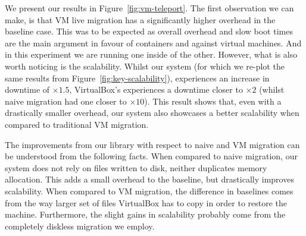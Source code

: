 We present our results in Figure~\ref{fig:vm-teleport}.
The first observation we can make, is that VM live migration has a
significantly higher overhead in the baseline case.
This was to be expected as overall overhead and slow boot times are the main
argument in favour of containers and against virtual machines.
And in this experiment we are running one inside of the other.
However, what is also worth noticing is the scalability.
Whilst our system (for which we re-plot the same results from
Figure~\ref{fig:key-scalability}), experiences an increase in downtime of
$\times 1.5$, VirtualBox's experiences a downtime closer to $\times 2$ (whilst
naive migration had one closer to $\times 10$).
This result shows that, even with a drastically smaller overhead, our system
also showcases a better scalability when compared to traditional VM migration.

The improvements from our library with respect to naive and VM migration can be
understood from the following facts.
When compared to naive migration, our system does not rely on files written to
disk, neither duplicates memory allocation.
This adds a small overhead to the baseline, but drastically improves
scalability.
When compared to VM migration, the difference in baselines comes from the way
larger set of files VirtualBox has to copy in order to restore the machine.
Furthermore, the slight gains in scalability probably come from the completely
diskless migration we employ.
